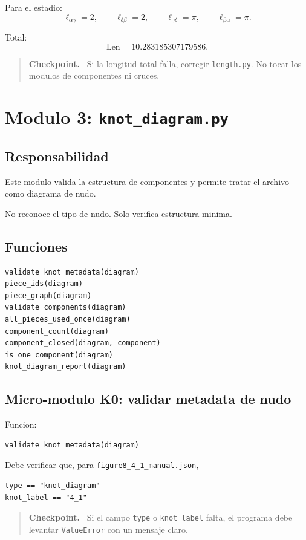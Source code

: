 \documentclass[11pt,letterpaper]{amsart}
\newcommand{\Len}{\mathrm{Len}}
\newenvironment{checkpoint}
{\par\medskip\noindent\begin{quote}\textbf{Checkpoint.}\ }
{\end{quote}\par\medskip}
\begin{document}
Para el estadio:
\[
\ell_{\alpha\gamma}=2,
\qquad
\ell_{\delta\beta}=2,
\qquad
\ell_{\gamma\delta}=\pi,
\qquad
\ell_{\beta\alpha}=\pi.
\]

Total:
\[
\Len=10.283185307179586.
\]

\begin{checkpoint}
Si la longitud total falla, corregir \texttt{length.py}. No tocar los modulos de
componentes ni cruces.
\end{checkpoint}

\section{Modulo 3: \texttt{knot\_diagram.py}}

\subsection{Responsabilidad}

Este modulo valida la estructura de componentes y permite tratar el archivo como
diagrama de nudo.

No reconoce el tipo de nudo. Solo verifica estructura minima.

\subsection{Funciones}

\begin{verbatim}
validate_knot_metadata(diagram)
piece_ids(diagram)
piece_graph(diagram)
validate_components(diagram)
all_pieces_used_once(diagram)
component_count(diagram)
component_closed(diagram, component)
is_one_component(diagram)
knot_diagram_report(diagram)
\end{verbatim}

\subsection{Micro-modulo K0: validar metadata de nudo}

Funcion:
\begin{verbatim}
validate_knot_metadata(diagram)
\end{verbatim}

Debe verificar que, para \texttt{figure8\_4\_1\_manual.json},
\begin{verbatim}
type == "knot_diagram"
knot_label == "4_1"
\end{verbatim}

\begin{checkpoint}
Si el campo \texttt{type} o \texttt{knot\_label} falta, el programa debe levantar
\texttt{ValueError} con un mensaje claro.
\end{checkpoint}
\end{document}
